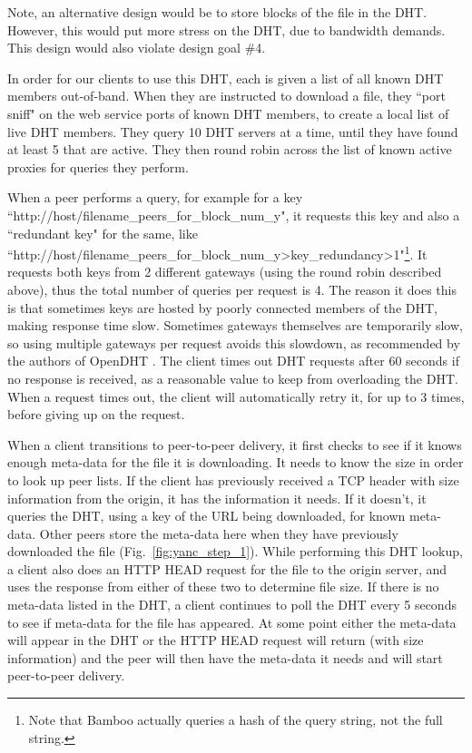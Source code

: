 Note, an alternative design would be to store blocks of the file in the DHT.  However, this
would put more stress on the DHT, due to bandwidth demands.  This design would also violate design goal \#4.

In order for our clients to use this DHT, each is given a list of all known DHT members out-of-band.  When they are instructed to download a file, 
they ``port sniff" on the web service ports of known DHT members, to create a local list of live DHT members.  
They query 10 DHT servers at a time, until they have found at least 5 that are active.
They then round robin across the list of known active proxies for queries they perform.

When a peer performs a query, for example for a key ``http://host/filename\_peers\_for\_block\_num\_y", it requests this key and also a ``redundant key" for the same, 
like ``http://host/filename\_peers\_for\_block\_num\_y\->key\_redundancy\->1"\footnote{Note that Bamboo actually queries a hash of the query string, not the full string.}.  
It requests both keys from 2 different gateways (using the round robin described above), 
thus the total number of queries per request is 4.  
The reason it does this is that sometimes keys are hosted by poorly connected members of the DHT, making response time slow.
Sometimes gateways themselves are temporarily slow, so using multiple gateways per request avoids this slowdown, as recommended by the authors of OpenDHT \cite{opendht_embarrassing}.
The client times out DHT requests after 60 seconds if no response is received, as a reasonable value to keep from 
overloading the DHT.  When a request times out, the client will automatically retry it, for up to 3 times, before giving up on the request.

When a client transitions to peer-to-peer delivery, it first checks to see if it knows enough meta-data for the file it is downloading.  
It needs to know the size in order to look up peer lists.
If the client has previously received a TCP header with size information from the origin, it has the information it needs.  If it doesn't, it
queries the DHT, using a key of the URL being downloaded, for known meta-data.  
Other peers store the meta-data here when they have previously downloaded the file (Fig.~\ref{fig:yanc_step_1}). 
While performing this DHT lookup, a client also does an HTTP HEAD request for the file to the origin server, and uses the response from either of these two to determine file size.  
If there is no meta-data listed in the DHT, a client continues to poll the DHT every 5 seconds to see if meta-data for the file has appeared.  At some point
either the meta-data will appear in the DHT or the HTTP HEAD request will return (with size information) and the peer will then have the meta-data 
it needs and will start  peer-to-peer delivery.

